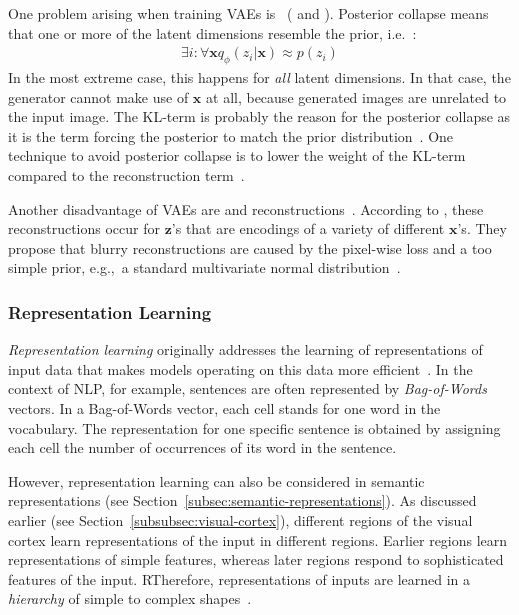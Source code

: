 One problem arising when training \acp{VAE} is ~(\citep{lucas2019understanding} and \citep[p. 694]{Goodfellow-et-al-2016}).
Posterior collapse means that one or more of the latent dimensions resemble the prior, i.e.~\citep{lucas2019understanding}:
\begin{align}
    \exists i: \forall \mathbf{x} q_{\phi}\left(z_{i} | \mathbf{x}\right) \approx p\left(z_{i}\right)
\end{align}
In the most extreme case, this happens for \textit{all} latent dimensions.
In that case, the generator cannot make use of $\bm{x}$ at all, because generated images are unrelated to the input image.
The KL-term is probably the reason for the posterior collapse as it is the term forcing the posterior to match the prior distribution~\citep{lucas2019understanding}.
One technique to avoid posterior collapse is to lower the weight of the KL-term compared to the reconstruction term~\citep{lucas2019understanding}.

Another disadvantage of \acp{VAE} are  and  reconstructions~\citep{zhao2017towards}.
According to \citet{zhao2017towards}, these reconstructions occur for $\bm{z}$'s that are encodings of a variety of different $\bm{x}$'s.
They propose that blurry reconstructions are caused by the pixel-wise loss and a too simple prior, e.g.,~a standard multivariate normal distribution~\citep{zhao2017towards}.

\subsubsection{Representation Learning}\label{subsubsec:representation_learning}
\textit{Representation learning} originally addresses the learning of representations of input data that makes models operating on this data more efficient~\citep{bengio2013representation}.
In the context of \ac{NLP}, for example, sentences are often represented by \textit{Bag-of-Words} vectors.
In a Bag-of-Words vector, each cell stands for one word in the vocabulary.
The representation for one specific sentence is obtained by assigning each cell the number of occurrences of its word in the sentence.

However, representation learning can also be considered in semantic representations (see Section~\ref{subsec:semantic-representations}).
As discussed earlier (see Section~\ref{subsubsec:visual-cortex}), different regions of the visual cortex learn representations of the input in different regions.
Earlier regions learn representations of simple features, whereas later regions respond to sophisticated features of the input.
RTherefore, representations of inputs are learned in a \textit{hierarchy} of simple to complex shapes~\citep{rodriguez2015hierarchical}.

